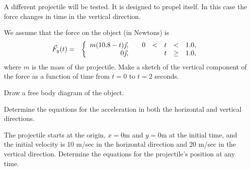 \begin{problem}
\item A different projectile will be tested. It is designed to propel
  itself. In this case the force changes in time in the vertical
  direction.
  \begin{subproblem}
  \item We assume that the force on the object (in Newtons)  is
      \begin{eqnarray*}
        \vec{F}_y(t) & = & \left\{
                     \begin{array}{r@{\hspace{2em}}rcccl}
                       m(10.8-t) \vec{\jmath}, & 0 & < & t & < & 1.0, \\
                       0 \vec{\jmath},       &   &   & t & \geq & 1.0,
                     \end{array}
                     \right.
      \end{eqnarray*}
      where $m$ is the mass of the projectile.  Make a sketch of the
      vertical component of the force as a function of time from $t=0$
      to $t=2$ seconds.

      \vfill

    \item Draw a free body diagram of the object.
      \vfill

    \item Determine the equations for the acceleration in both the
      horizontal and vertical directions.

      \vfill

      \clearpage

    \item The projectile starts at the origin, $x=0$m and $y=0$m at
      the initial time, and the initial velocity is 10 m/sec in the
      horizontal direction and 20 m/sec in the vertical
      direction. Determine the equations for the projectile's position
      at any time.

      \vfill

  \end{subproblem}

\clearpage



\end{problem}

\postClass

